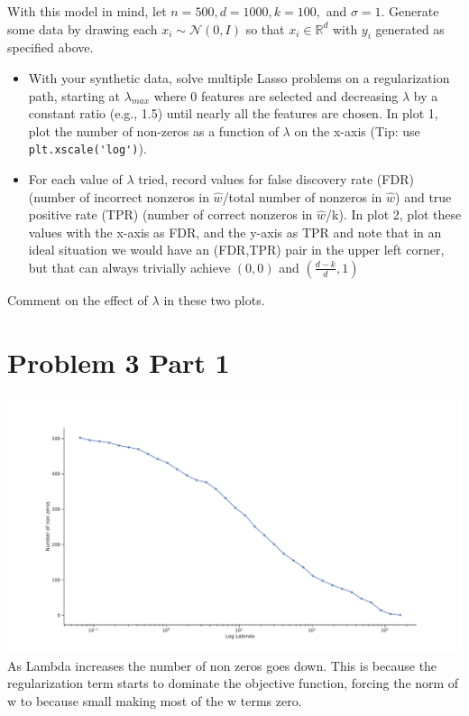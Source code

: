 \documentclass{article}
\newcommand{\field}[1]{\mathbb{#1}}
\newcommand{\1}{\mathbf{1}}
\newcommand{\R}{\field{R}} %
\begin{document}
With this model in mind, let $n = 500, d = 1000, k = 100,$ and $\sigma = 1$.  Generate some data by drawing each $x_i \sim \mathcal{N}(0, I)$ so that $x_i \in \R^d$ with $y_i$ generated as specified above.
  \begin{itemize}
    \item  With your synthetic data, solve multiple Lasso problems on a regularization path, starting at $\lambda_{max}$ where $0$ features are selected and
  decreasing $\lambda$ by a constant ratio (e.g., 1.5) until nearly all the features are chosen.  
  In plot 1, plot the number of non-zeros as a function of $\lambda$ on the x-axis (Tip: use \verb|plt.xscale('log')|).
  \item  For each value of $\lambda$ tried, record values for false discovery rate (FDR) (number of incorrect nonzeros in $\widehat{w}$/total number of nonzeros in $\widehat{w}$) and true positive rate (TPR)
  (number of correct nonzeros in $\widehat{w}$/k).
  In plot 2, plot these values with the x-axis as FDR, and the y-axis as TPR and note that in an ideal situation we would have an (FDR,TPR) pair in the upper left corner, but that can always trivially achieve $(0,0)$ and $(\tfrac{d-k}{d},1)$ 
\end{itemize}      
  Comment on the effect of $\lambda$ in these two plots.\\




\section*{Problem 3 Part 1}
\includegraphics[width=\textwidth]{hw2/P3part1.pdf}
As Lambda increases the number of non zeros goes down. This is because the regularization term starts to dominate the objective function, forcing the norm of w to because small making most of the w terms zero. 
\end{document}
